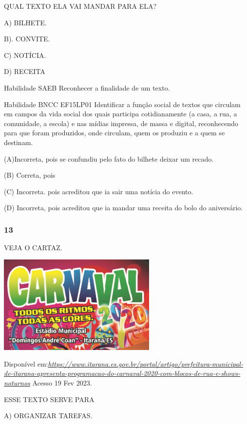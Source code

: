 \begin{escola}
QUAL TEXTO ELA VAI MANDAR PARA ELA?

A) BILHETE.

B). CONVITE.

C) NOTÍCIA.

D) RECEITA

Habilidade SAEB Reconhecer a finalidade de um texto.

Habilidade BNCC EF15LP01 Identificar a função social de textos que
circulam em campos da vida social dos quais participa cotidianamente (a
casa, a rua, a comunidade, a escola) e nas mídias impressa, de massa e
digital, reconhecendo para que foram produzidos, onde circulam, quem os
produziu e a quem se destinam.

(A)Incorreta, pois se confundiu pelo fato do bilhete deixar um recado.

(B) Correta, pois

(C) Incorreta. pois acreditou que ia sair uma notícia do evento.

(D) Incorreta, pois acreditou que ia mandar uma receita do bolo do
aniversário.\protect\hypertarget{_heading=h.s4vmdpjsaa88}{}{}

\subsubsection{13}\label{section-38}

VEJA O CARTAZ.

\includegraphics[width=3.10650in,height=1.94326in]{media/image204.png}

Disponível
em:\href{https://www.itarana.es.gov.br/portal/artigo/prefeitura-municipal-de-itarana-apresenta-programacao-do-carnaval-2020-com-blocos-de-rua-e-shows-noturnos}{\emph{https://www.itarana.es.gov.br/portal/artigo/prefeitura-municipal-de-itarana-apresenta-programacao-do-carnaval-2020-com-blocos-de-rua-e-shows-noturnos}}
Acesso 19 Fev 2023.

\protect\hypertarget{_heading=h.2u6wntf}{}{}ESSE TEXTO SERVE PARA

A) ORGANIZAR TAREFAS.


\end{escola}
